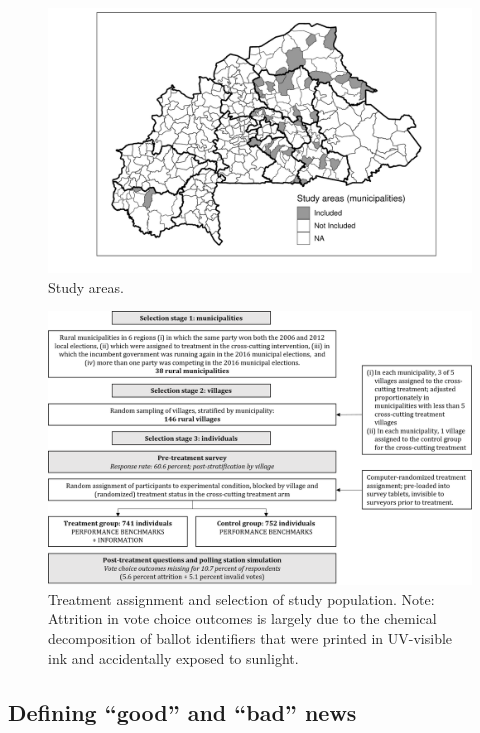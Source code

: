 \documentclass[11pt]{article}
\begin{document}
\begin{figure}
\begin{center}
\includegraphics[width=\textwidth]{Figures/BF_StudyAreas.pdf}
\end{center}
\caption{Study areas. }
\label{FigMap}
\end{figure}

\begin{figure}
\vspace{1em}

\includegraphics[width=\textwidth]{Figures/BF_ConsortDiagram.png}

\caption{Treatment assignment and selection of study population. Note: Attrition in vote choice outcomes is largely due to the chemical decomposition of ballot identifiers that were printed in UV-visible ink and accidentally exposed to sunlight. }
\label{FigConsortDiagram}
\end{figure}

\subsection{Defining ``good'' and ``bad'' news}
	
\end{document}
